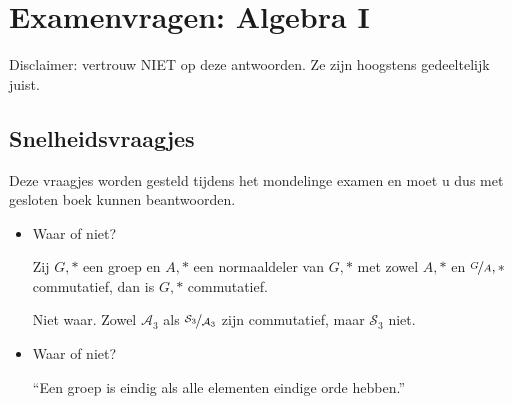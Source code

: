 \documentclass[main.tex]{subfiles}
\begin{document}
 \chapter{Examenvragen: Algebra I}
 \label{cha:examen-a}

Disclaimer: vertrouw NIET op deze antwoorden.
Ze zijn hoogstens gedeeltelijk juist.

 \section{Snelheidsvraagjes}
 \label{sec:snelheidsvraagjes}

Deze vraagjes worden gesteld tijdens het mondelinge examen en moet u dus met gesloten boek kunnen beantwoorden.

 \begin{itemize}
 \item Waar of niet?
   \begin{center}
     Zij $G,*$ een groep en $A,*$ een normaaldeler van $G,*$ met zowel $A,*$ en $\nicefrac{G}{A},*$ commutatief, dan is $G,*$ commutatief.
   \end{center}

   Niet waar.
   Zowel $\mathcal{A}_{3}$ als $\nicefrac{\mathcal{S}_{3}}{\mathcal{A}_{3}}$ zijn commutatief, maar $\mathcal{S}_{3}$ niet.
 \item Waar of niet?
   \begin{center}
     ``Een groep is eindig als alle elementen eindige orde hebben.''
   \end{center}


\end{itemize}
\end{document}
